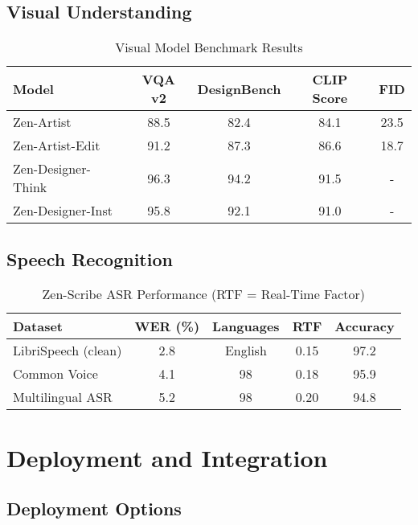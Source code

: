 \documentclass[11pt,a4paper]{article}
\begin{document}
\subsection{Visual Understanding}

\begin{table}[H]
\centering
\begin{tabular}{lcccc}
\toprule
\textbf{Model} & \textbf{VQA v2} & \textbf{DesignBench} & \textbf{CLIP Score} & \textbf{FID} \\
\midrule
Zen-Artist & 88.5 & 82.4 & 84.1 & 23.5 \\
Zen-Artist-Edit & 91.2 & 87.3 & 86.6 & 18.7 \\
Zen-Designer-Think & 96.3 & 94.2 & 91.5 & - \\
Zen-Designer-Inst & 95.8 & 92.1 & 91.0 & - \\
\bottomrule
\end{tabular}
\caption{Visual Model Benchmark Results}
\end{table}

\subsection{Speech Recognition}

\begin{table}[H]
\centering
\begin{tabular}{lcccc}
\toprule
\textbf{Dataset} & \textbf{WER (\%)} & \textbf{Languages} & \textbf{RTF} & \textbf{Accuracy} \\
\midrule
LibriSpeech (clean) & 2.8 & English & 0.15 & 97.2 \\
Common Voice & 4.1 & 98 & 0.18 & 95.9 \\
Multilingual ASR & 5.2 & 98 & 0.20 & 94.8 \\
\bottomrule
\end{tabular}
\caption{Zen-Scribe ASR Performance (RTF = Real-Time Factor)}
\end{table}

\section{Deployment and Integration}

\subsection{Deployment Options}
\end{document}
